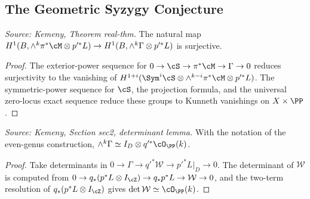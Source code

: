 \subsection{The Geometric Syzygy Conjecture}

\begin{theorem}
  \label{thm:kemeny_real_thm}
  \textit{Source: Kemeny, Theorem real-thm.}
  The natural map
  \(H^1(B,\wedge^k\pi^*\cM\otimes p'^*L)\to
    H^1(B,\wedge^k\Gamma\otimes p'^*L)\)
  is surjective.
\end{theorem}
\begin{proof}
  The exterior-power sequence for \(0\to\cS\to\pi^*\cM\to\Gamma\to0\) reduces
  surjectivity to the vanishing of
  \(H^{1+i}(\Sym^i\cS\otimes\wedge^{k-i}\pi^*\cM\otimes p'^*L)\).
  The symmetric-power sequence for \(\cS\), the projection formula, and the
  universal zero-locus exact sequence reduce these groups to Kunneth vanishings
  on \(X\times\PP\).
\end{proof}

\begin{lemma}
  \label{lem:kemeny_even_det_gamma}
  \textit{Source: Kemeny, Section sec2, determinant lemma.}
  With the notation of the even-genus construction,
  \(\wedge^k\Gamma\simeq I_D\otimes q'^*\cO_{\PP}(k)\).
\end{lemma}
\begin{proof}
  Take determinants in
  \(0\to\Gamma\to q'^*\mathcal W\to p'^*L|_D\to0\).  The determinant of
  \(\mathcal W\) is computed from
  \(0\to q_*(p^*L\otimes I_{\cZ})\to q_*p^*L\to\mathcal W\to0\), and the
  two-term resolution of \(q_*(p^*L\otimes I_{\cZ})\) gives
  \(\det\mathcal W\simeq \cO_{\PP}(k)\).
\end{proof}

